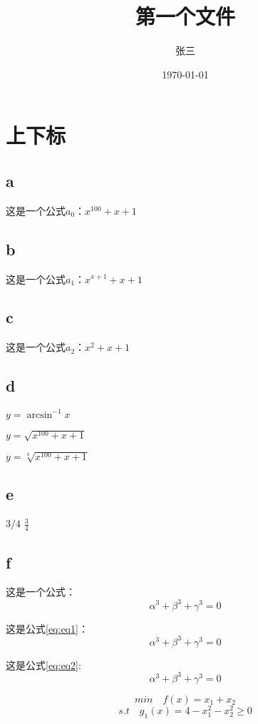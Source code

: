 \documentclass{article}
\title{\songti 第一个文件}
\date{\today}
\author{\kaishu 张三}
\begin{document}
	\maketitle
	\tableofcontents
	
	\section{上下标}
	\subsection{a}
	这是一个公式$a_0$：$x^{100}+x+1$\\
	\subsection{b}
	这是一个公式$a_1$：\(x^{x+1}+x+1\)\\
	\subsection{c}
	这是一个公式$a_2$：\begin{math}
		x^2+x+1 \end{math}\\
	\subsection{d}
	$y = \arcsin^{-1} x$
	
	$y = \sqrt{x^{100}+x+1}$
	
	$y = \sqrt[4]{x^{100}+x+1}$
	\subsection{e}
	$3/4$ $\frac{3}{4}$
	\subsection{f}
	这是一个公式：
	$$\alpha^3 + \beta^3 + \gamma^3 = 0$$
	
	这是公式\ref{eq:eq1}：
	\begin{equation}
		\alpha^3 + \beta^3 + \gamma^3 = 0 \label{eq:eq1}
	\end{equation}

	这是公式\ref{eq:eq2}:
	\begin{equation*}
	\alpha^3 + \beta^3 + \gamma^3 = 0 \label{eq:eq2}
	\end{equation*}

	\begin{equation}
		min \quad f(x)=x_1+x_2
	\end{equation}
	$$s.t \quad g_1(x)=4-x_1^2-x_2^2 \ge 0$$
	
\end{document}

